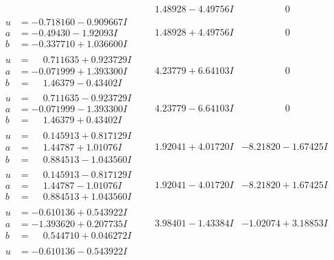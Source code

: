 \documentclass[1p]{elsarticle_modified}
\theoremstyle{definition}
\begin{document}
$$\begin{array}{c|c|c}
 & \phantom{-}1.48928 - 4.49756 I & \phantom{-0.000000 } 0 \\ \hline\begin{aligned}
u &= -0.718160 - 0.909667 I \\
a &= -0.49430 - 1.92093 I \\
b &= -0.337710 + 1.036600 I\end{aligned}
 & \phantom{-}1.48928 + 4.49756 I & \phantom{-0.000000 } 0 \\ \hline\begin{aligned}
u &= \phantom{-}0.711635 + 0.923729 I \\
a &= -0.071999 + 1.393300 I \\
b &= \phantom{-}1.46379 - 0.43402 I\end{aligned}
 & \phantom{-}4.23779 + 6.64103 I & \phantom{-0.000000 } 0 \\ \hline\begin{aligned}
u &= \phantom{-}0.711635 - 0.923729 I \\
a &= -0.071999 - 1.393300 I \\
b &= \phantom{-}1.46379 + 0.43402 I\end{aligned}
 & \phantom{-}4.23779 - 6.64103 I & \phantom{-0.000000 } 0 \\ \hline\begin{aligned}
u &= \phantom{-}0.145913 + 0.817129 I \\
a &= \phantom{-}1.44787 + 1.01076 I \\
b &= \phantom{-}0.884513 - 1.043560 I\end{aligned}
 & \phantom{-}1.92041 + 4.01720 I & -8.21820 - 1.67425 I \\ \hline\begin{aligned}
u &= \phantom{-}0.145913 - 0.817129 I \\
a &= \phantom{-}1.44787 - 1.01076 I \\
b &= \phantom{-}0.884513 + 1.043560 I\end{aligned}
 & \phantom{-}1.92041 - 4.01720 I & -8.21820 + 1.67425 I \\ \hline\begin{aligned}
u &= -0.610136 + 0.543922 I \\
a &= -1.393620 + 0.207735 I \\
b &= \phantom{-}0.544710 + 0.046272 I\end{aligned}
 & \phantom{-}3.98401 - 1.43384 I & -1.02074 + 3.18853 I \\ \hline\begin{aligned}
u &= -0.610136 - 0.543922 I \\

\end{aligned}
\end{array}$$
\end{document}

